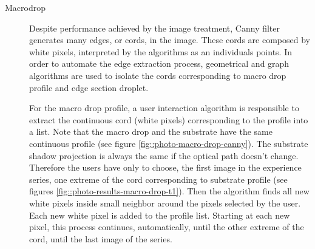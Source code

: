 \documentclass[12pt]{iopart}
\begin{document}
\begin{description}
\item[ Macrodrop]

Despite performance achieved by the image treatment, Canny filter
 generates many edges, or cords, in the image. These cords are composed
 by white pixels, interpreted by the algorithms as an individuals points.
 In order to automate the edge extraction process, geometrical and
 graph algorithms are used  to isolate the cords corresponding to
 macro drop profile and edge section droplet.

For the macro drop profile, a user interaction algorithm is responsible
 to extract the continuous cord (white pixels) corresponding
 to the profile into a list. Note  that the macro drop and 
the substrate have the same continuous profile (see figure \ref{fig::photo-macro-drop-canny}).
 The substrate shadow projection is always the same if the optical
 path doesn't change. Therefore the users have only to choose, the
 first image in the experience series, one extreme  of the cord 
corresponding to substrate profile (see figures \ref{fig::photo-results-macro-drop-t1}).
 Then the algorithm finds all new white pixels inside small neighbor around
 the pixels selected by the user. Each new white pixel  is added to the
 profile list. Starting at each new pixel, this process continues,
 automatically, until the other extreme of the cord, until the last
 image of the series.
 

\end{description}
\end{document}
